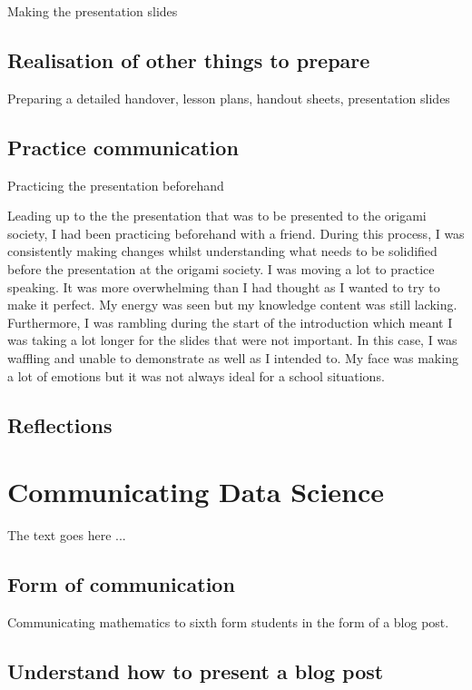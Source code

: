 \documentclass[12pt, a4paper,oneside]{book}
\numberwithin{equation}{section}
\begin{document}
Making the presentation slides

\section{Realisation of other things to prepare}\label{sec:x.x}

Preparing a detailed handover, lesson plans, handout sheets, presentation slides

\section{Practice communication}\label{sec:x.x}

Practicing the presentation beforehand

Leading up to the the presentation that was to be presented to the origami society, I had been practicing beforehand with a friend. During this process, I was consistently making changes whilst understanding what needs to be solidified before the presentation at the origami society. I was moving a lot to practice speaking. It was more overwhelming than I had thought as I wanted to try to make it perfect. My energy was seen but my knowledge content was still lacking. Furthermore, I was rambling during the start of the introduction which meant I was taking a lot longer for the slides that were not important. In this case, I was waffling and unable to demonstrate as well as I intended to. My face was making a lot of emotions but it was not always ideal for a school situations.

\section{Reflections}\label{sec:x.x}

\chapter{Communicating Data Science}\label{ch:x}

The text goes here ...

\section{Form of communication}\label{sec:x.x}

Communicating mathematics to sixth form students in the form of a blog post.

\section{Understand how to present a blog post}\label{sec:x.x}
\end{document}
